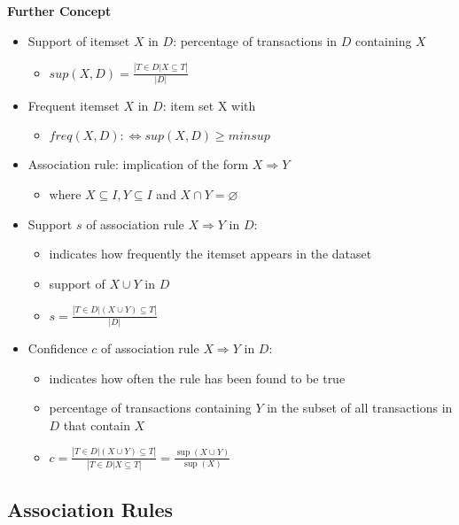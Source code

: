 \documentclass[../notes.tex]{subfiles}
\begin{document}
\textbf{Further Concept}
\begin{itemize}
  \item Support of itemset $X$ in $D$: percentage of transactions in $D$ containing $X$
    \begin{itemize}
      \item $sup(X, D) = \frac{|{T \in D | X \subseteq T}|}{|D|}$
    \end{itemize}
  \item Frequent itemset $X$ in $D$: item set X with
    \begin{itemize}
      \item $freq(X, D) :\Leftrightarrow sup(X, D) \ge minsup$
    \end{itemize}
  \item Association rule: implication of the form $ X \Rightarrow Y$
    \begin{itemize}
      \item where $X \subseteq I, Y \subseteq I$ and $X \cap Y = \varnothing$
    \end{itemize}
  \item Support $s$ of association rule $X \Rightarrow Y$ in $D$:
    \begin{itemize}
      \item indicates how frequently the itemset appears in the dataset
      \item support of $X \cup Y$ in $D$
      \item $s = \frac{|{T \in D | (X \cup Y) \subseteq T}|}{|D|}$
    \end{itemize}
  \item Confidence $c$ of association rule $X \Rightarrow Y$ in $D$:
    \begin{itemize}
      \item indicates how often the rule has been found to be true
      \item percentage of transactions containing $Y$ in the subset of all transactions in $D$ that contain $X$
      \item $c = \frac{|{T \in D | (X \cup Y) \subseteq T}|}{|{T \in D | X \subseteq T}|} = \frac{\sup(X \cup Y)}{\sup(X)}$
    \end{itemize}
\end{itemize}

\newpage

\subsection{Association Rules}
\end{document}
